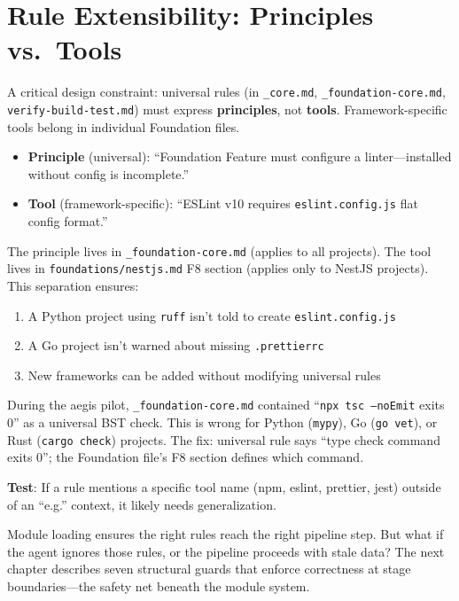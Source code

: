 \documentclass[11pt,a4paper,openright,twoside]{report}
\newcommand{\file}[1]{\texttt{#1}}
\begin{document}
\section{Rule Extensibility: Principles vs.\ Tools}
\label{sec:rule-extensibility}

A critical design constraint: universal rules (in \file{\_core.md}, \file{\_foundation-core.md}, \file{verify-build-test.md}) must express \textbf{principles}, not \textbf{tools}. Framework-specific tools belong in individual Foundation files.

\begin{itemize}[nosep]
  \item \textbf{Principle} (universal): ``Foundation Feature must configure a linter---installed without config is incomplete.''
  \item \textbf{Tool} (framework-specific): ``ESLint v10 requires \texttt{eslint.config.js} flat config format.''
\end{itemize}

The principle lives in \file{\_foundation-core.md} (applies to all projects). The tool lives in \file{foundations/nestjs.md} F8 section (applies only to NestJS projects). This separation ensures:

\begin{enumerate}[nosep]
  \item A Python project using \texttt{ruff} isn't told to create \texttt{eslint.config.js}
  \item A Go project isn't warned about missing \texttt{.prettierrc}
  \item New frameworks can be added without modifying universal rules
\end{enumerate}

\begin{warnbox}
During the aegis pilot, \file{\_foundation-core.md} contained ``\texttt{npx tsc --noEmit} exits 0'' as a universal BST check. This is wrong for Python (\texttt{mypy}), Go (\texttt{go vet}), or Rust (\texttt{cargo check}) projects. The fix: universal rule says ``type check command exits 0''; the Foundation file's F8 section defines which command.

\textbf{Test}: If a rule mentions a specific tool name (npm, eslint, prettier, jest) outside of an ``e.g.'' context, it likely needs generalization.
\end{warnbox}

Module loading ensures the right rules reach the right pipeline step. But what if the agent ignores those rules, or the pipeline proceeds with stale data? The next chapter describes seven structural guards that enforce correctness at stage boundaries---the safety net beneath the module system.
\end{document}
